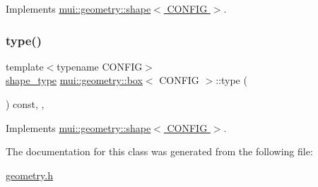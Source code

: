 Implements \hyperlink{classmui_1_1geometry_1_1shape_ab1b2e763113b96dd0ae3deedfa0e7d22}{mui\+::geometry\+::shape$<$ C\+O\+N\+F\+I\+G $>$}.

\mbox{\label{classmui_1_1geometry_1_1box_a88a57a405777e8f34e632030d725f7be}} 
\subsubsection{\texorpdfstring{type()}{type()}}
{\footnotesize\ttfamily template$<$typename C\+O\+N\+F\+IG$>$ \\
\hyperlink{namespacemui_1_1geometry_a5f311a343181e2f20482e5c9afb0f136}{shape\+\_\+type} \hyperlink{classmui_1_1geometry_1_1box}{mui\+::geometry\+::box}$<$ C\+O\+N\+F\+IG $>$\+::type (\begin{DoxyParamCaption}{ }\end{DoxyParamCaption}) const\hspace{0.3cm}{\ttfamily [inline]}, {\ttfamily [virtual]}, {\ttfamily [noexcept]}}



Implements \hyperlink{classmui_1_1geometry_1_1shape_a4a0fe17b8ca5cc29e260cb38c9fcf8fe}{mui\+::geometry\+::shape$<$ C\+O\+N\+F\+I\+G $>$}.



The documentation for this class was generated from the following file\+:\begin{DoxyCompactItemize}
\item 
\hyperlink{geometry_8h}{geometry.\+h}\end{DoxyCompactItemize}
